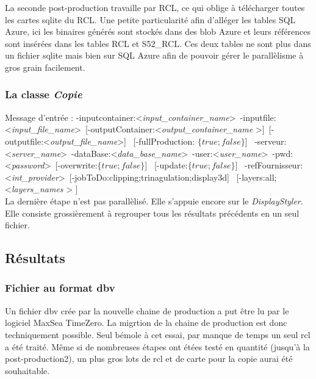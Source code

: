 La seconde post-production travaille par RCL, ce qui oblige à
télécharger toutes les cartes sqlite du RCL. Une petite particularité
afin d'alléger les tables SQL Azure, ici les binaires générés sont
stockés dans des blob Azure et leurs références sont insérées dans les
tables RCL et S52\_RCL. Ces deux tables ne sont plus dans un fichier
sqlite mais bien sur SQL Azure afin de pouvoir gérer le parallèlisme à
gros grain facilement.

\subsubsection{La classe \textit{Copie}}
Message d'entrée : 
-inputcontainer:\textless \textit{input\_container\_name}\textgreater \   
-inputfile:\textless \textit{input\_file\_name}\textgreater \ 
[-outputContainer:\textless \textit{output\_container\_name} \textgreater ]\  
[-outputfile:\textless \textit{output\_file\_name}\textgreater ] \ 
[-fullProduction: $\{true;false\}$] \ 
-serveur:\textless \textit{server\_name}\textgreater \   
-dataBase:\textless \textit{data\_base\_name}\textgreater \   
-user:\textless \textit{user\_name}\textgreater  \ 
-pwd:\textless \textit{password}\textgreater  \ 
[-overwrite:$\{true;false\}$] \ 
[-update:$\{true;false\}$] \ 
-refFournisseur:\textless \textit{int\_provider}\textgreater \   
[-jobToDo:{clipping;trinagulation;display3d}] \ 
[-layers:{all;\textless \textit{layers\_names} \textgreater} ] \\

La dernière étape n'est pas parallèlisé. Elle s'appuie encore sur le
\textit{DisplayStyler}. Elle consiste grossièrement à regrouper tous
les résultats précédents en un seul fichier.




%
%

\subsection{Résultats}

\subsubsection{Fichier au format dbv}

Un fichier dbv crée par la nouvelle chaine de production a put être
lu par le logiciel MaxSea TimeZero. La migrtion de la chaine de
production est donc techniquement possible. Seul bémole à cet essai,
par manque de temps un seul rcl a été traité. Même si de nombreuses
étapes ont étées testé en quantité (jusqu'à la post-production2), un
plus gros lots de rcl et de carte pour la copie aurai été souhaitable.

